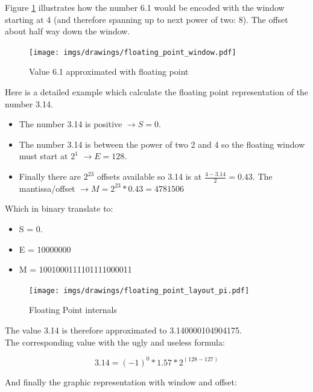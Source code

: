 \documentclass[book.tex]{subfiles}
\begin{document}
Figure \ref{fig:fp_internals_window} illustrates how the number 6.1 would be encoded with the window starting at 4 (and therefore spanning up to next power of two: 8). The offset about half way down the window.

\begin{figure}[H]
\centering
\texttt{[image: imgs/drawings/floating\_point\_window.pdf]}

\caption{Value 6.1 approximated with floating point}
\label{fig:fp_internals_window}
\end{figure}
  \bigskip
  
Here is a detailed example which calculate the floating point representation of the number 3.14.
\begin{itemize}
 \item The number 3.14 is positive  $\rightarrow S=0$.
 \item The number 3.14 is between the power of two 2 and 4 so the floating window must start at $2^1$  $\rightarrow E=128$.
 \item Finally there are $2^{23}$ offsets available so 3.14 is at $\frac{4-3.14}{2} = 0.43 $. The mantissa/offset $\rightarrow M = 2^{23}*0.43 = 4781506$
\end{itemize}

Which in binary translate to:

\begin{itemize}
\item S = 0.
\item E = 10000000
\item M = 1001000111101111000011
\end{itemize}

\begin{figure}[H]
\centering
\texttt{[image: imgs/drawings/floating\_point\_layout\_pi.pdf]}
\caption{Floating Point internals}
\label{fig:fp_internals}
\end{figure}
  \bigskip

The value 3.14 is therefore approximated to 3.140000104904175.\\

The corresponding value with the ugly and useless formula:

\begin{equation}
3.14 = (-1)^0 * 1.57 * 2^{(128-127)}
\end{equation}

\bigskip

And finally the graphic representation with window and offset:\\
\end{document}

